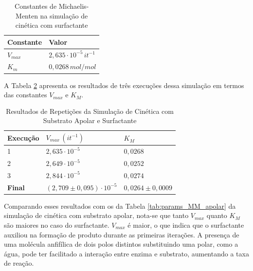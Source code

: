 \documentclass[12pt,oneside]{report}
\begin{document}
\begin{table}[H]
    \centering
    \caption{Constantes de Michaelis-Menten na simulação de cinética com surfactante}
    \vspace{0.2cm}
    \begin{tabularx}{\textwidth}{X m{5cm}}
        \hline
        \textbf{Constante} & \textbf{Valor}                     \\
        \hline
        $V_{max}$          & $2{,}635 \cdot 10^{-5} \, it^{-1}$ \\
        $K_m$              & $0{,}0268 \, mol/mol$              \\
        \hline
    \end{tabularx}
    \vspace{0.2cm}
    \label{tab:params_MM_surfactant}
\end{table}

A Tabela \ref{tab:surf_repeticoes} apresenta os resultados de três execuções dessa simulação em termos das constantes $V_{max}$ e $K_M$.

\begin{table}[H]
    \centering
    \caption{Resultados de Repetições da Simulação de Cinética com Substrato Apolar e Surfactante}
    \vspace{0.2cm}
    \begin{tabularx}{\textwidth}{X X m{5cm}}
        \hline
        \textbf{Execução} & \textbf{$V_{max} \, (it^{-1})$ }      & \textbf{$K_M$}          \\
        \hline
        1                 & $2{,}635 \cdot 10^{-5}$               & $0{,}0268$              \\
        2                 & $2{,}649 \cdot 10^{-5}$               & $0{,}0252$              \\
        3                 & $2{,}844 \cdot 10^{-5}$               & $0{,}0274$              \\
        \hline
        \textbf{Final}    & $(2{,}709 \pm 0{,}095) \cdot 10^{-5}$ & $0{,}0264 \pm 0{,}0009$ \\
        \hline
    \end{tabularx}
    \vspace{0.2cm}
    \label{tab:surf_repeticoes}
\end{table}

Comparando esses resultados com os da Tabela \ref{tab:params_MM_apolar} da simulação de cinética com substrato apolar, nota-se que tanto $V_{max}$ quanto $K_M$ são maiores no caso do surfactante. $V_{max}$ é maior, o que indica que o surfactante auxiliou na formação de produto durante as primeiras iterações. A presença de uma molécula anfifílica de dois polos distintos substituindo uma polar, como a água, pode ter facilitado a interação entre enzima e substrato, aumentando a taxa de reação.
\end{document}
